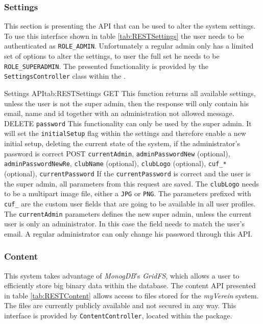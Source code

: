 \subsubsection{Settings}

This section is presenting the \gls{API} that can be used to alter the system settings. To use this interface shown in table \vref{tab:RESTSettings} the user needs to be authenticated as \texttt{ROLE\_ADMIN}. Unfortunately a regular admin only has a limited set of options to alter the settings, to user the full set he needs to be \texttt{ROLE\_SUPERADMIN}. The presented functionality is provided by the \texttt{SettingsController} class within the .

\begin{RESTTable}{Settings API}{tab:RESTSettings}
		{GET}
		{}
		{This function returns all available settings, unless the user is not the super admin, then the response will only contain his email, name and id together with an administration not allowed message.}
		{DELETE}
		{\texttt{password}}
		{This functionality can only be used by the super admin. It will set the \texttt{initialSetup} flag within the settings and therefore enable a new initial setup, deleting the current state of the system, if the administrator's password is correct}
		{POST}
		{\texttt{currentAdmin}, \texttt{adminPasswordNew} (optional), \texttt{adminPasswordNewRe}, \texttt{clubName} (optional), \texttt{clubLogo} (optional), \texttt{cuf\_*} (optional), \texttt{currentPassword}}
		{If the \texttt{currentPassword} is correct and the user is the super admin, all parameters from this request are saved. The \texttt{clubLogo} needs to be a multipart image file, either a \texttt{JPG} or \texttt{PNG}. The parameters prefixed with \texttt{cuf\_} are the custom user fields that are going to be available in all user profiles. The \texttt{currentAdmin} parameters defines the new super admin, unless the current user is only an administrator. In this case the field needs to match the user's email. A regular administrator can only change his password through this \gls{API}.}
\end{RESTTable}

\subsubsection{Content}

This system takes advantage of \emph{MonogDB}'s \emph{GridFS}, which allows a user to efficiently store big binary data within the database. The content \gls{API} presented in table \vref{tab:RESTContent} allows access to files stored for the \emph{myVerein} system. The files are currently publicly available and not secured in any way. This interface is provided by \texttt{ContentController}, located within the  package.

